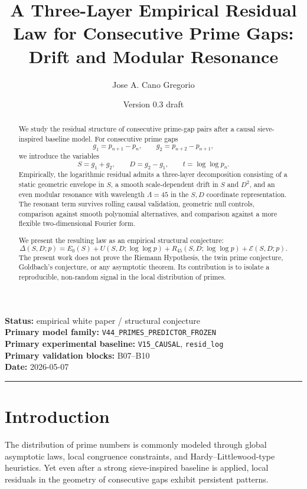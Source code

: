 \documentclass[11pt]{article}
\title{A Three-Layer Empirical Residual Law for Consecutive Prime Gaps:\\ Drift and Modular Resonance}
\author{Jose A. Cano Gregorio}
\date{Version 0.3 draft}
\begin{document}
\maketitle

\noindent\textbf{Status:} empirical white paper / structural conjecture \\
\textbf{Primary model family:} \texttt{V44\_PRIMES\_PREDICTOR\_FROZEN} \\
\textbf{Primary experimental baseline:} \texttt{V15\_CAUSAL}, \texttt{resid\_log} \\
\textbf{Primary validation blocks:} B07--B10 \\
\textbf{Date:} 2026-05-07

\vspace{1em}
\hrule
\vspace{1em}

\begin{abstract}
We study the residual structure of consecutive prime-gap pairs after a causal sieve-inspired baseline model. For consecutive prime gaps
\[
g_1=p_{n+1}-p_n,\qquad g_2=p_{n+2}-p_{n+1},
\]
we introduce the variables
\[
S=g_1+g_2,\qquad D=g_2-g_1,\qquad t=\log\log p_n.
\]
Empirically, the logarithmic residual admits a three-layer decomposition consisting of a static geometric envelope in \(S\), a smooth scale-dependent drift in \(S\) and \(D^2\), and an even modular resonance with wavelength \(\Lambda=45\) in the \(S,D\) coordinate representation. The resonant term survives rolling causal validation, geometric null controls, comparison against smooth polynomial alternatives, and comparison against a more flexible two-dimensional Fourier form.

We present the resulting law as an empirical structural conjecture:
\[
\Delta(S,D;p)=E_0(S)+U(S,D;\log\log p)+R_{45}(S,D;\log\log p)+\mathcal{E}(S,D;p).
\]
The present work does not prove the Riemann Hypothesis, the twin prime conjecture, Goldbach's conjecture, or any asymptotic theorem. Its contribution is to isolate a reproducible, non-random signal in the local distribution of primes.
\end{abstract}

\section{Introduction}

The distribution of prime numbers is commonly modeled through global asymptotic laws, local congruence constraints, and Hardy--Littlewood-type heuristics. Yet even after a strong sieve-inspired baseline is applied, local residuals in the geometry of consecutive gaps exhibit persistent patterns.
\end{document}
